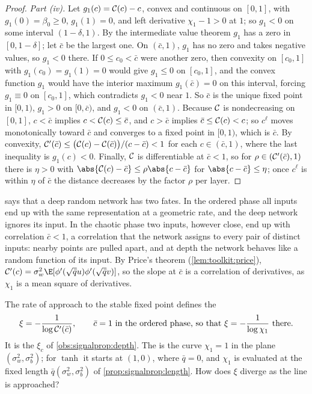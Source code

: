 \begin{refsection}
\begin{proof}
\emph{Part (iv).} Let $g_1(c)=\mathcal{C}(c)-c$, convex and continuous on $[0,1]$, with $g_1(0)=\beta_0\ge0$, $g_1(1)=0$, and left derivative $\chi_1-1>0$ at $1$; so $g_1<0$ on some interval $(1-\delta,1)$. By the intermediate value theorem $g_1$ has a zero in $[0,1-\delta]$; let $\bar c$ be the largest one. On $(\bar c,1)$, $g_1$ has no zero and takes negative values, so $g_1<0$ there. If $0\le c_0<\bar c$ were another zero, then convexity on $[c_0,1]$ with $g_1(c_0)=g_1(1)=0$ would give $g_1\le0$ on $[c_0,1]$, and the convex function $g_1$ would have the interior maximum $g_1(\bar c)=0$ on this interval, forcing $g_1\equiv0$ on $[c_0,1]$, which contradicts $g_1<0$ near $1$. So $\bar c$ is the unique fixed point in $[0,1)$, $g_1>0$ on $[0,\bar c)$, and $g_1<0$ on $(\bar c,1)$. Because $\mathcal{C}$ is nondecreasing on $[0,1]$, $c<\bar c$ implies $c<\mathcal{C}(c)\le\bar c$, and $c>\bar c$ implies $\bar c\le\mathcal{C}(c)<c$; so $c^\ell$ moves monotonically toward $\bar c$ and converges to a fixed point in $[0,1)$, which is $\bar c$. By convexity, $\mathcal{C}'(\bar c)\le\bigl(\mathcal{C}(c)-\mathcal{C}(\bar c)\bigr)/(c-\bar c)<1$ for each $c\in(\bar c,1)$, where the last inequality is $g_1(c)<0$. Finally, $\mathcal{C}$ is differentiable at $\bar c<1$, so for $\rho\in(\mathcal{C}'(\bar c),1)$ there is $\eta>0$ with $\abs{\signalpropC(c)-\bar c}\le\rho\abs{c-\bar c}$ for $\abs{c-\bar c}\le\eta$; once $c^\ell$ is within $\eta$ of $\bar c$ the distance decreases by the factor $\rho$ per layer.
\end{proof}

 says that a deep random network has two fates. In the ordered phase all inputs end up with the same representation at a geometric rate, and the deep network ignores its input. In the chaotic phase two inputs, however close, end up with correlation $\bar c<1$, a correlation that the network assigns to every pair of distinct inputs: nearby points are pulled apart, and at depth the network behaves like a random function of its input. By Price's theorem (\cref{lem:toolkit:price}), $\signalpropC'(c)=\sigma_w^2\E[\phi'(\sqrt{\bar q}u)\phi'(\sqrt{\bar q}v)]$, so the slope at $\bar c$ is a correlation of derivatives, as $\chi_1$ is a mean square of derivatives.

The rate of approach to the stable fixed point defines the 
\begin{equation}\label{eq:signalprop:xi}
  \xi=-\frac1{\log\mathcal{C}'(\bar c)},\qquad \bar c=1\ \text{in the ordered phase, so that}\ \xi=-\frac1{\log\chi_1}\ \text{there}.
\end{equation}
It is the $\xi_c$ of \cref{obs:signalprop:depth}. The  is the curve $\chi_1=1$ in the plane $(\sigma_w^2,\sigma_b^2)$; for $\tanh$ it starts at $(1,0)$, where $\bar q=0$, and $\chi_1$ is evaluated at the fixed length $\bar q(\sigma_w^2,\sigma_b^2)$ of \cref{prop:signalprop:length}. How does $\xi$ diverge as the line is approached?


\end{refsection}
